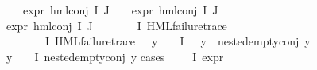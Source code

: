 \begin{isabellebody}
\ \ \ {\isachardoublequoteopen}expr{\isacharunderscore}{\kern0pt}{}\ {\isacharparenleft}{\kern0pt}hml{\isacharunderscore}{\kern0pt}conj\ I\ J\ {\isasymPhi}{\isacharparenright}{\kern0pt}\ {\isasymle}\ {}{\isachardoublequoteclose}\ {\isachardoublequoteopen}expr{\isacharunderscore}{\kern0pt}{}\ {\isacharparenleft}{\kern0pt}hml{\isacharunderscore}{\kern0pt}conj\ I\ J\ {\isasymPhi}{\isacharparenright}{\kern0pt}\ {\isasymle}\ {}{\isachardoublequoteclose}\ \isanewline
{\isachardoublequoteopen}expr{\isacharunderscore}{\kern0pt}{}\ {\isacharparenleft}{\kern0pt}hml{\isacharunderscore}{\kern0pt}conj\ I\ J\ {\isasymPhi}{\isacharparenright}{\kern0pt}\ {\isasymle}\ {}{\isachardoublequoteclose}\ {\isachardoublequoteopen}{\isasymforall}{\isasymphi}\ {\isasymin}\ {\isacharparenleft}{\kern0pt}{\isasymPhi}\ {\isacharbackquote}{\kern0pt}\ I{\isacharparenright}{\kern0pt}{\isachardot}{\kern0pt}\ HML{\isacharunderscore}{\kern0pt}failure{\isacharunderscore}{\kern0pt}trace\ {\isasymphi}{\isachardoublequoteclose}\isanewline
\ \ \ {\isachardoublequoteopen}{\isacharparenleft}{\kern0pt}{\isasymexists}{\isasympsi}\ {\isasymin}\ {\isacharparenleft}{\kern0pt}{\isasymPhi}\ {\isacharbackquote}{\kern0pt}\ I{\isacharparenright}{\kern0pt}{\isachardot}{\kern0pt}\ {\isacharparenleft}{\kern0pt}HML{\isacharunderscore}{\kern0pt}failure{\isacharunderscore}{\kern0pt}trace\ {\isasympsi}{\isacharparenright}{\kern0pt}\ {\isasymand}\ {\isacharparenleft}{\kern0pt}{\isasymforall}y\ {\isasymin}\ {\isacharparenleft}{\kern0pt}{\isasymPhi}\ {\isacharbackquote}{\kern0pt}\ I{\isacharparenright}{\kern0pt}{\isachardot}{\kern0pt}\ {\isasympsi}\ {\isasymnoteq}\ y\ {\isasymlongrightarrow}\ nested{\isacharunderscore}{\kern0pt}empty{\isacharunderscore}{\kern0pt}conj\ y{\isacharparenright}{\kern0pt}{\isacharparenright}{\kern0pt}\ {\isasymor}\ \isanewline
{\isacharparenleft}{\kern0pt}{\isasymforall}y\ {\isasymin}\ {\isacharparenleft}{\kern0pt}{\isasymPhi}\ {\isacharbackquote}{\kern0pt}\ I{\isacharparenright}{\kern0pt}{\isachardot}{\kern0pt}\ nested{\isacharunderscore}{\kern0pt}empty{\isacharunderscore}{\kern0pt}conj\ y{\isacharparenright}{\kern0pt}{\isachardoublequoteclose}\isanewline
%
\isadelimproof
%
\endisadelimproof
%
\isatagproof
{}\isamarkupfalse%
{\isacharparenleft}{\kern0pt}cases\ {\isachardoublequoteopen}{\isacharparenleft}{\kern0pt}{\isasymexists}{\isasympsi}\ {\isasymin}\ {\isacharparenleft}{\kern0pt}{\isasymPhi}\ {\isacharbackquote}{\kern0pt}\ I{\isacharparenright}{\kern0pt}{\isachardot}{\kern0pt}\ expr{\isacharunderscore}{\kern0pt}{}\ {\isasympsi}\ {\isasymge}\ {}{\isacharparenright}{\kern0pt}{\isachardoublequoteclose}{\isacharparenright}{\kern0pt}\isanewline

\end{isabellebody}
